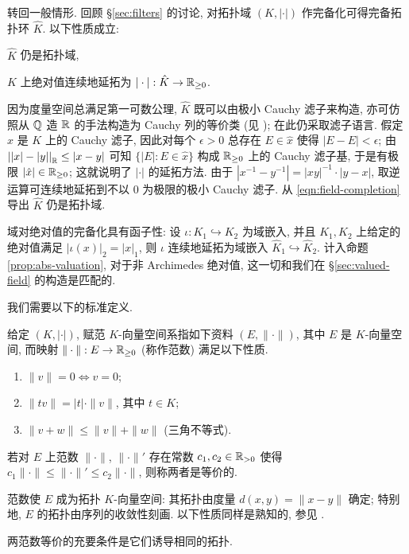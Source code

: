 转回一般情形. 回顾 \S\ref{sec:filters} 的讨论, 对拓扑域 $(K, |\cdot|)$ 作完备化可得完备拓扑环 $\hat{K}$. 以下性质成立:
\begin{compactitem}
	\item $\hat{K}$ 仍是拓扑域,
	\item $K$ 上绝对值连续地延拓为 $|\cdot|: \hat{K} \to \mathbb{R}_{\geq 0}$.
\end{compactitem}
因为度量空间总满足第一可数公理, $\hat{K}$ 既可以由极小 Cauchy 滤子来构造, 亦可仿照从 $\mathbb{Q}$ 造 $\mathbb{R}$ 的手法构造为 Cauchy 列的等价类 (见 \cite[\S 8.1]{Xiong}); 在此仍采取滤子语言. 假定 $\hat{x}$ 是 $K$ 上的 Cauchy 滤子, 因此对每个 $\epsilon > 0$ 总存在 $E \in \hat{x}$ 使得 $|E-E| < \epsilon$; 由 $\left| |x| - |y| \right|_{\mathbb{R}} \leq  |x - y|$ 可知 $\{ |E|: E \in \hat{x} \}$ 构成 $\mathbb{R}_{\geq 0}$ 上的 Cauchy 滤子基, 于是有极限 $|\hat{x}| \in \mathbb{R}_{\geq 0}$; 这就说明了 $|\cdot|$ 的延拓方法. 由于 $|x^{-1} - y^{-1}| = |xy|^{-1} \cdot |y-x|$, 取逆运算可连续地延拓到不以 $0$ 为极限的极小 Cauchy 滤子. 从 \eqref{eqn:field-completion} 导出 $\hat{K}$ 仍是拓扑域.

域对绝对值的完备化具有函子性: 设 $\iota: K_1 \hookrightarrow K_2$ 为域嵌入, 并且 $K_1, K_2$ 上给定的绝对值满足 $|\iota(x)|_2 = |x|_1$, 则 $\iota$ 连续地延拓为域嵌入 $\hat{K}_1 \hookrightarrow \hat{K}_2$. 计入命题 \ref{prop:abs-valuation}, 对于非 Archimedes 绝对值, 这一切和我们在 \S\ref{sec:valued-field} 的构造是匹配的.

我们需要以下的标准定义.
\begin{definition}[范数]
	给定 $(K, |\cdot|)$, 赋范 $K$-向量空间系指如下资料 $(E, \|\cdot\|)$, 其中 $E$ 是 $K$-向量空间, 而映射 $\|\cdot\|: E \to \mathbb{R}_{\geq 0}$ (称作范数) 满足以下性质.
	\begin{enumerate}[\bfseries {NM}.1]
		\item $\|v\| = 0 \iff v =0$;
		\item $\|tv\| = |t| \cdot \|v\|$, 其中 $t \in K$;
		\item $\|v+w\| \leq \|v\| + \|w\|$ (三角不等式).
	\end{enumerate}
	若对 $E$ 上范数 $\|\cdot\|$, $\|\cdot\|'$ 存在常数 $c_1, c_2 \in \mathbb{R}_{>0}$ 使得 $c_1 \|\cdot\| \leq \|\cdot\|' \leq c_2 \|\cdot\|$, 则称两者是等价的.
\end{definition}
范数使 $E$ 成为拓扑 $K$-向量空间: 其拓扑由度量 $d(x,y) = \|x-y\|$ 确定; 特别地, $E$ 的拓扑由序列的收敛性刻画. 以下性质同样是熟知的, 参见 \cite[推论 1.4.17]{Zh1}.
\begin{lemma}
	两范数等价的充要条件是它们诱导相同的拓扑.
\end{lemma}

